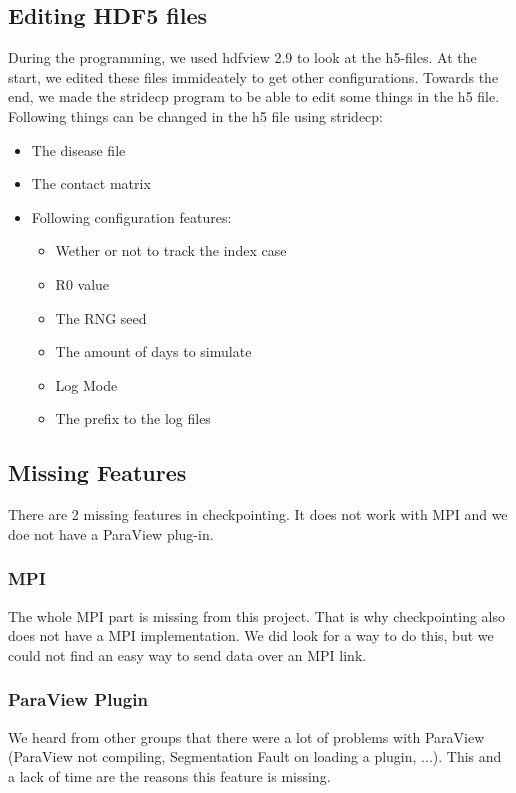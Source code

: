 \documentclass[a4paper,12pt]{article}
\begin{document}
\subsection{Editing HDF5 files}
During the programming, we used hdfview 2.9 to look at the h5-files. At the start, we edited these files immideately to get other configurations. 
Towards the end, we made the stridecp program to be able to edit some things in the h5 file.
\\Following things can be changed in the h5 file using stridecp:
\begin{itemize}
	\item The disease file
	\item The contact matrix
	\item Following configuration features:
	\begin{itemize}
		\item Wether or not to track the index case
		\item R0 value
		\item The RNG seed
		\item The amount of days to simulate
		\item Log Mode
		\item The prefix to the log files
	\end{itemize}
\end{itemize}
\subsection{Missing Features}
There are 2 missing features in checkpointing. It does not work with MPI and we doe not have a ParaView plug-in.

\subsubsection{MPI}
The whole MPI part is missing from this project. That is why checkpointing also does not have a MPI implementation. We did look for a way to do this, but we could not find an easy way to send data over an MPI link.

\subsubsection{ParaView Plugin}
We heard from other groups that there were a lot of problems with ParaView (ParaView not compiling, Segmentation Fault on loading a plugin, ...). This and a lack of time are the reasons this feature is missing.
\end{document}
